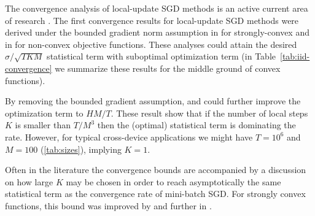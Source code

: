 \documentclass[11pt]{article}
\begin{document}
The convergence analysis of local-update SGD methods is an active current area of research \citep{stich2018local, lin2018don, yu2018parallel, wang2018cooperative, reisizadeh2019fedpaq,patel19communication,khaled2019better,woodworth2020local}. 
The first convergence results for local-update SGD methods were derived under the bounded gradient norm  assumption in \citet{stich2018local} for strongly-convex and in \citet{yu2018parallel} for non-convex objective functions. These analyses could attain the desired $\sigma/\sqrt{TKM}$ statistical term with suboptimal optimization term (in Table~\ref{tab:iid-convergence} we summarize these results for the middle ground of convex functions).

By removing the bounded gradient assumption, \citet{wang2018cooperative} and \citet{stich2019error} could further improve the optimization term to $HM/T$. These result show that if the number of local steps $K$ is smaller than $T/M^3$ then the (optimal) statistical term is dominating the rate. However, for typical cross-device applications we might have $T=10^6$ and $M=100$ (\cref{tab:sizes}), implying $K=1$.

Often in the literature the convergence bounds are accompanied by a discussion on how large $K$ may be chosen in order to reach asymptotically the same statistical term as the  convergence rate of mini-batch SGD. For strongly convex functions, this bound was improved by \citet{khaled2019better} and further in \citet{stich2019error}.
\end{document}
